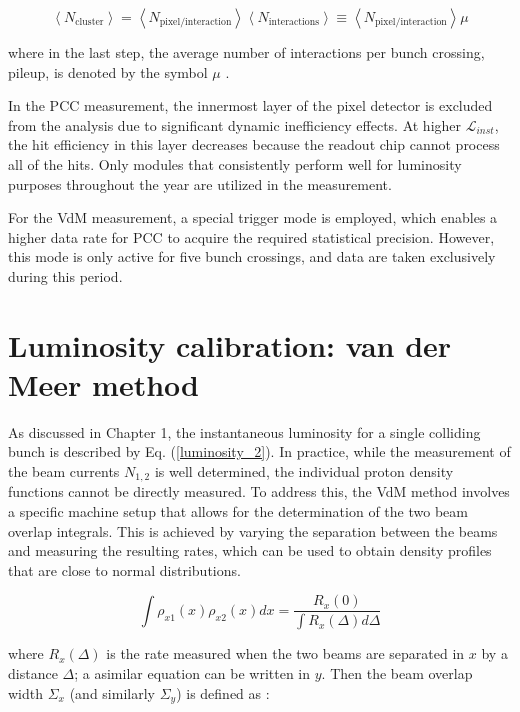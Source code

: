 \begin{equation}
\left < N_{\text{cluster}} \right > = \left < N_{\text{pixel}/\text{interaction}} \right >  \left < N_{\text{interactions}} \right > \equiv \left < N_{\text{pixel}/\text{interaction}} \right > \mu
\end{equation}

where in the last step, the average number of interactions per bunch crossing, pileup, is denoted by the symbol $\mu$ \cite{PCC_PAS_12_001}.

In the PCC measurement, the innermost layer of the pixel detector is excluded from the analysis due to significant dynamic inefficiency effects. At higher $\mathcal{L}_{inst}$, the hit efficiency in this layer decreases because the readout chip cannot process all of the hits. Only modules that consistently perform well for luminosity purposes throughout the year are utilized in the measurement.

For the VdM measurement, a special trigger mode is employed, which enables a higher data rate for PCC to acquire the required statistical precision. However, this mode is only active for five bunch crossings, and data are taken exclusively during this period.

\section{Luminosity calibration: van der Meer method}

As discussed in Chapter 1, the instantaneous luminosity for a single colliding bunch is described by Eq. (\ref{luminosity_2}). In practice, while the measurement of the beam currents $N_{1,2}$ is well determined, the individual proton density functions cannot be directly measured. To address this, the VdM method involves a specific machine setup that allows for the determination of the two beam overlap integrals. This is achieved by varying the separation between the beams and measuring the resulting rates, which can be used to obtain density profiles that are close to normal distributions.

\begin{equation}
\int \rho_{x1}(x) \rho_{x2}(x) dx = \frac{R_{x}(0)}{\int R_{x}(\Delta) d\Delta}
\end{equation}

where $R_{x}(\Delta)$ is the rate measured when the two beams are separated in $x$ by a distance $\Delta$; a asimilar equation can be written in $y$. Then the beam overlap width $\Sigma_{x}$ (and similarly $\Sigma_{y}$) is defined as \cite{pas_18}:

